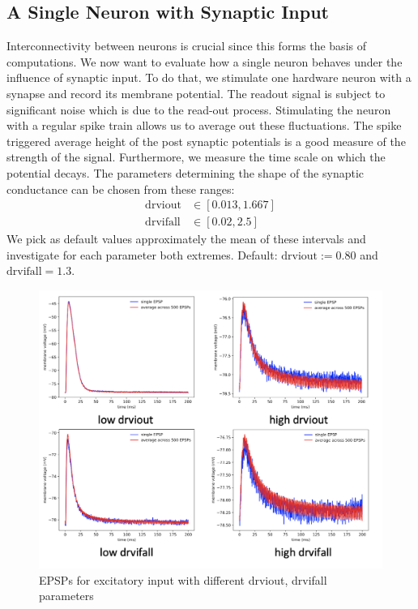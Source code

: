 \documentclass[a4paper,twocolumn]{article}
\begin{document}
\subsection{A Single Neuron with Synaptic Input}
Interconnectivity between neurons is crucial since this forms the basis of
computations.  We now want to evaluate how a single neuron behaves under the influence
 of synaptic input.  To do that,  we stimulate one hardware neuron with a synapse
 and record its membrane potential.  The readout signal is subject to significant
 noise which is due to the read-out process.  Stimulating the neuron with a regular
 spike train allows us to average out these fluctuations.  The spike triggered average
 height of the post synaptic potentials is a good measure of the strength of the signal.
 Furthermore,  we measure the time scale on which the potential decays.
The parameters determining the shape of the synaptic conductance can be chosen
from these ranges:
\begin{align*}
	\text{drviout} &\in \left[ 0.013, 1.667  \right] \\
	\text{drvifall} &\in \left[ 0.02,  2.5  \right]
\end{align*}
We pick as default values approximately the mean of these intervals and
investigate for each parameter both extremes.  Default: $\text{drviout} := 0.80$
and $\text{drvifall}=1.3$.
 \begin{figure}[ht]
     \centering
     \includegraphics[width=.5\textwidth]{figures/epsp_summary.png}
     \caption{EPSPs for excitatory input with different drviout,  drvifall
     parameters}
     \label{fig:epsp_default}
 \end{figure}
\end{document}
